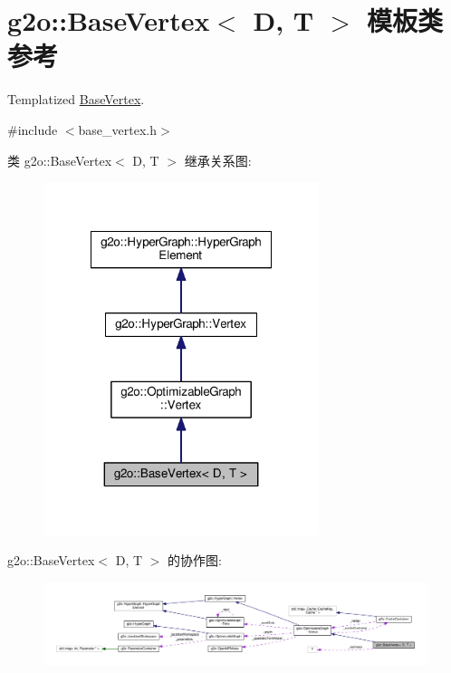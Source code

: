 \hypertarget{classg2o_1_1BaseVertex}{\section{g2o\-:\-:Base\-Vertex$<$ D, T $>$ 模板类 参考}
\label{classg2o_1_1BaseVertex}
}


Templatized \hyperlink{classg2o_1_1BaseVertex}{Base\-Vertex}.  




{\ttfamily \#include $<$base\-\_\-vertex.\-h$>$}



类 g2o\-:\-:Base\-Vertex$<$ D, T $>$ 继承关系图\-:
\nopagebreak
\begin{figure}[H]
\begin{center}
\leavevmode
\includegraphics[width=228pt]{classg2o_1_1BaseVertex__inherit__graph}
\end{center}
\end{figure}


g2o\-:\-:Base\-Vertex$<$ D, T $>$ 的协作图\-:
\nopagebreak
\begin{figure}[H]
\begin{center}
\leavevmode
\includegraphics[width=350pt]{classg2o_1_1BaseVertex__coll__graph}
\end{center}
\end{figure}
